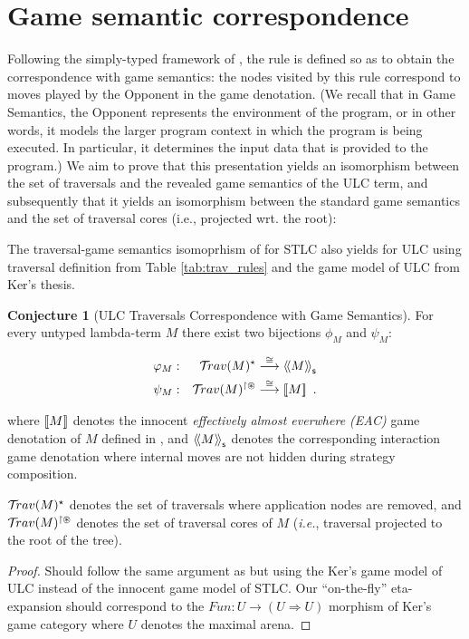 \documentclass{article}
\makeatletter
\theoremstyle{definition}
\newtheorem{conjecture}{Conjecture}[section]
\renewcommand\ie{{\it i.e.\@\xspace}}
\makeatother
\begin{document}
\section{Game semantic correspondence}
Following the simply-typed framework of \cite{BlumPhd}, the rule  is defined so as to obtain the correspondence with game semantics: the nodes visited by this rule correspond to moves played by the Opponent in the game denotation. (We recall that in Game Semantics, the Opponent represents the environment of the program, or in other words, it models the larger program context in which the program is being executed. In particular, it determines the input data that is provided to the program.)
We aim to prove that this presentation yields an isomorphism between the set of traversals and the revealed game semantics of the ULC term, and subsequently that it yields an isomorphism between the standard game semantics and the set of traversal cores (i.e., projected wrt. the root):

The traversal-game semantics isomoprhism of \cite{BlumPhd} for STLC also yields for ULC using traversal definition from Table \ref{tab:trav_rules} and the game model of ULC from Ker's thesis.

\begin{conjecture}[ULC Traversals Correspondence with Game Semantics]
\label{thm:ulc_corresp}
For every untyped lambda-term $M$ there exist two bijections
$\phi_M$ and $\psi_M$:

\begin{eqnarray*}
 \varphi_M  &:& \mathcal{T}\!rav(M)^\star \stackrel{\cong}{\longrightarrow} {\langle\!\langle M \rangle\!\rangle}_{\sf s} \\
 \psi_M  &:& \mathcal{T}\!rav(M)^{\upharpoonright \circledast} \stackrel{\cong}{\longrightarrow} {[\![ M ]\!]} \enspace .
\end{eqnarray*}

where
${[\![ M ]\!]}$ denotes the innocent \emph{effectively almost everwhere (EAC)} game denotation of $M$ defined in \cite{KerThesis},
and ${\langle\!\langle M \rangle\!\rangle}_{\sf s}$ denotes the corresponding interaction game denotation where internal moves are not hidden during strategy composition.

$\mathcal{T}\!rav(M)^\star$ denotes the set of traversals where application nodes are removed, and $\mathcal{T}\!rav(M)^{\upharpoonright
\circledast}$ denotes the set of traversal cores of $M$ (\ie, traversal projected to the root of the tree).
\end{conjecture}
\begin{proof}
Should follow the same argument as \cite{BlumPhd} but using the Ker's game model of ULC instead of the innocent game model of STLC.
Our ``on-the-fly'' eta-expansion should correspond to the $Fun : U \rightarrow (U \Rightarrow U)$ morphism of Ker's game category where $U$ denotes the maximal arena.
\end{proof}
\end{document}
